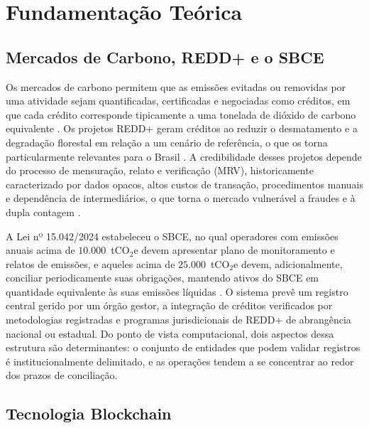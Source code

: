 \section{Fundamentação Teórica}
\label{sec:background}

\subsection{Mercados de Carbono, REDD+ e o SBCE}

Os mercados de carbono permitem que as emissões evitadas ou removidas por uma atividade sejam quantificadas, certificadas e negociadas como créditos, em que cada crédito corresponde tipicamente a uma tonelada de dióxido de carbono equivalente \citep{Aguiar2018}. Os projetos REDD+ geram créditos ao reduzir o desmatamento e a degradação florestal em relação a um cenário de referência, o que os torna particularmente relevantes para o Brasil \citep{Aguiar2018,Neves2025}. A credibilidade desses projetos depende do processo de mensuração, relato e verificação (MRV), historicamente caracterizado por dados opacos, altos custos de transação, procedimentos manuais e dependência de intermediários, o que torna o mercado vulnerável a fraudes e à dupla contagem \citep{Kotsialou2022,Howson2019geoforum,Caburlao2026fsi}.

A Lei nº 15.042/2024 estabeleceu o SBCE, no qual operadores com emissões anuais acima de $10.000$~tCO$_2$e devem apresentar plano de monitoramento e relatos de emissões, e aqueles acima de $25.000$~tCO$_2$e devem, adicionalmente, conciliar periodicamente suas obrigações, mantendo ativos do SBCE em quantidade equivalente às suas emissões líquidas \citep{Lei15042}. O sistema prevê um registro central gerido por um órgão gestor, a integração de créditos verificados por metodologias registradas e programas jurisdicionais de REDD+ de abrangência nacional ou estadual. Do ponto de vista computacional, dois aspectos dessa estrutura são determinantes: o conjunto de entidades que podem validar registros é institucionalmente delimitado, e as operações tendem a se concentrar ao redor dos prazos de conciliação.

\subsection{Tecnologia Blockchain}

